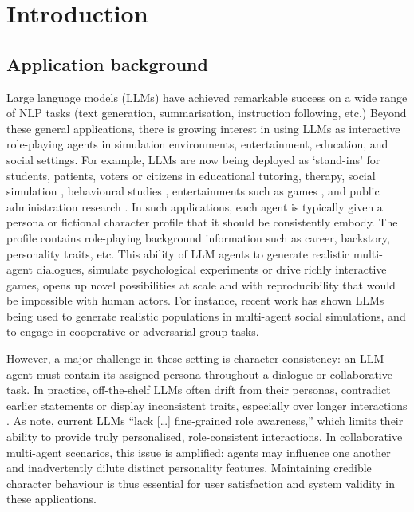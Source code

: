 \documentclass{article}
\begin{document}
\newpage





\listoffigures
\listoftables


\newpage


\tableofcontents 

\newpage




\section{Introduction}

\subsection{Application background}

Large language models (LLMs) have achieved remarkable success on a wide range of NLP tasks (text generation, summarisation, instruction following, etc.) \citep{ji2025enhancing,guo2024review} Beyond these general applications, there is growing interest in using LLMs as interactive role-playing agents in simulation environments, entertainment, education, and social settings. For example, LLMs are now being deployed as ‘stand-ins’ for students, patients, voters or citizens in educational tutoring, therapy, social simulation \citep{park2022social, park2023generative}, behavioural studies \citep{aher2023using}, entertainments such as games \citep{xu2024survey}, and public administration research \citep{xiao2023simulating}. In such applications, each agent is typically given a persona or fictional character profile that it should be consistently embody. The profile contains role-playing background information such as career, backstory, personality traits, etc. This ability of LLM agents to generate realistic multi-agent dialogues, simulate psychological experiments or drive richly interactive games, opens up novel possibilities at scale and with reproducibility that would be impossible with human actors. For instance, recent work has shown LLMs being used to generate realistic populations in multi-agent social simulations, and to engage in cooperative \citep{guo2026collab} or adversarial \citep{baltaji2024cultured} group tasks.

However, a major challenge in these setting is character consistency: an LLM agent must contain its assigned persona throughout a dialogue or collaborative task. In practice, off-the-shelf LLMs often drift from their personas, contradict earlier statements or display inconsistent traits, especially over longer interactions \citep{choi2024examining, bhandari2025can, abdulhai2025consistently}. As \citet{ji2025enhancing} note, current LLMs “lack […] fine-grained role awareness,” which limits their ability to provide truly personalised, role-consistent interactions. In collaborative multi-agent scenarios, this issue is amplified: agents may influence one another and inadvertently dilute distinct personality features. Maintaining credible character behaviour is thus essential for user satisfaction and system validity in these applications.
\end{document}
